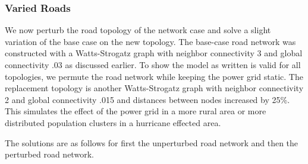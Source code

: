 \documentclass{article}
\begin{document}
	 \begin{table}[htbp]
		\centering
		\caption{Repair Schedule by interaction method}
		\label{time}
	\end{table}
	\subsubsection{Varied Roads}
	We now perturb the road topology of the network case and solve a slight variation of the base case on the new topology. The base-case road network was constructed with a Watts-Strogatz graph with neighbor connectivity 3 and global connectivity .03 as discussed earlier. To show the model as written is valid for all topologies, we permute the road network while keeping the power grid static. The replacement topology is another Watts-Strogatz graph with neighbor connectivity 2 and global connectivity .015 and distances between nodes increased by 25\%. This simulates the effect of the power grid in a more rural area or more distributed population clusters in a hurricane effected area.
	
	The solutions are as follows for first the unperturbed road network and then the perturbed road network.
	
\end{document}
